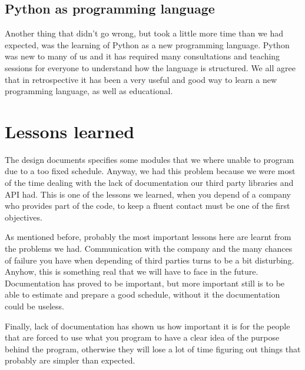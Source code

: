 \documentclass[12pt,a4paper]{article}
\begin{document}
\subsection{Python as programming language}

Another thing that didn't go wrong, but took a little more time than we had expected, was the learning of Python as a new programming language. Python was new to many of us and it has required many consultations and teaching sessions for everyone to understand how the language is structured. We all agree that in retrospective it has been a very useful and good way to learn a new programming language, as well as educational.

\section{Lessons learned}

The design documents specifies some modules that we where unable to program due to a too fixed schedule. Anyway, we had this problem because we were most of the time dealing with the lack of documentation our third party libraries and API had. This is one of the lessons we learned, when you depend of a company who provides part of the code, to keep a fluent contact must be one of the first objectives.

As mentioned before, probably the most important lessons here are learnt from the problems we had. Communication with the company and the many chances of failure you have when depending of third parties turns to be a bit disturbing. Anyhow, this is something real that we will have to face in the future. Documentation has proved to be important, but more important still is to be able to estimate and prepare a good schedule, without it the documentation could be useless. 

Finally, lack of documentation has shown us how important it is for the people that are forced to use what you program to have a clear idea of the purpose behind the program, otherwise they will lose a lot of time figuring out things that probably are simpler than expected.
\end{document}
